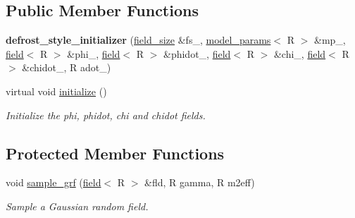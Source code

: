 \subsection*{Public Member Functions}
\begin{DoxyCompactItemize}
\item 
\hypertarget{classdefrost__style__initializer_aa2a1cc1ebdd76c14d97bb63b155dee7f}{
{\bfseries defrost\_\-style\_\-initializer} (\hyperlink{structfield__size}{field\_\-size} \&fs\_\-, \hyperlink{structmodel__params}{model\_\-params}$<$ R $>$ \&mp\_\-, \hyperlink{classfield}{field}$<$ R $>$ \&phi\_\-, \hyperlink{classfield}{field}$<$ R $>$ \&phidot\_\-, \hyperlink{classfield}{field}$<$ R $>$ \&chi\_\-, \hyperlink{classfield}{field}$<$ R $>$ \&chidot\_\-, R adot\_\-)}
\label{classdefrost__style__initializer_aa2a1cc1ebdd76c14d97bb63b155dee7f}

\item 
\hypertarget{classdefrost__style__initializer_a862bd10996445ab83e81caabf7f21676}{
virtual void \hyperlink{classdefrost__style__initializer_a862bd10996445ab83e81caabf7f21676}{initialize} ()}
\label{classdefrost__style__initializer_a862bd10996445ab83e81caabf7f21676}

\begin{DoxyCompactList}\small\item\em Initialize the phi, phidot, chi and chidot fields. \item\end{DoxyCompactList}\end{DoxyCompactItemize}
\subsection*{Protected Member Functions}
\begin{DoxyCompactItemize}
\item 
void \hyperlink{classdefrost__style__initializer_a37b1d166d031097073140552513bc132}{sample\_\-grf} (\hyperlink{classfield}{field}$<$ R $>$ \&fld, R gamma, R m2eff)
\begin{DoxyCompactList}\small\item\em Sample a Gaussian random field. \item\end{DoxyCompactList}\end{DoxyCompactItemize}
